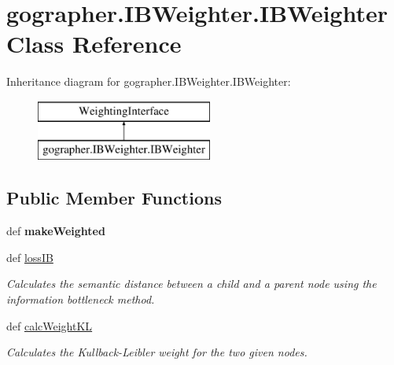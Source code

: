\hypertarget{classgographer_1_1_i_b_weighter_1_1_i_b_weighter}{\section{gographer.\-I\-B\-Weighter.\-I\-B\-Weighter Class Reference}
\label{classgographer_1_1_i_b_weighter_1_1_i_b_weighter}
}
Inheritance diagram for gographer.\-I\-B\-Weighter.\-I\-B\-Weighter\-:\begin{figure}[H]
\begin{center}
\leavevmode
\includegraphics[height=2.000000cm]{classgographer_1_1_i_b_weighter_1_1_i_b_weighter}
\end{center}
\end{figure}
\subsection*{Public Member Functions}
\begin{DoxyCompactItemize}
\item 
\hypertarget{classgographer_1_1_i_b_weighter_1_1_i_b_weighter_a9dced08b78914bcafebe0eacc4b37a37}{def {\bfseries make\-Weighted}}\label{classgographer_1_1_i_b_weighter_1_1_i_b_weighter_a9dced08b78914bcafebe0eacc4b37a37}

\item 
def \hyperlink{classgographer_1_1_i_b_weighter_1_1_i_b_weighter_a655b60453d2c3d5061c263aeba9d4c81}{loss\-I\-B}
\begin{DoxyCompactList}\small\item\em Calculates the semantic distance between a child and a parent node using the information bottleneck method. \end{DoxyCompactList}\item 
def \hyperlink{classgographer_1_1_i_b_weighter_1_1_i_b_weighter_abcaf1384a508c3f86a7942b1367f6ce2}{calc\-Weight\-K\-L}
\begin{DoxyCompactList}\small\item\em Calculates the Kullback-\/\-Leibler weight for the two given nodes. \end{DoxyCompactList}\end{DoxyCompactItemize}



